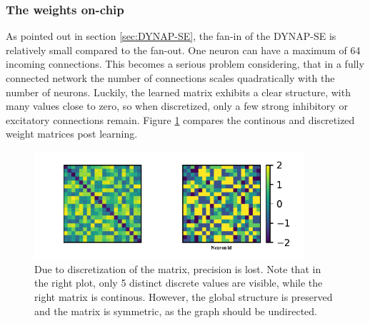 \documentclass[twoside,11pt]{article}
\begin{document}
\newpage

\subsubsection{The weights on-chip} \label{sec:weights}

As pointed out in section \ref{sec:DYNAP-SE}, the fan-in of the DYNAP-SE is relatively small
compared to the fan-out. One neuron can have a maximum of 64 incoming connections.
This becomes a serious problem considering, that in a fully connected network
the number of connections scales quadratically with the number of neurons.
Luckily, the learned matrix exhibits a clear structure, with many values close to zero, so when
discretized, only a few strong inhibitory or excitatory connections remain. Figure \ref{fig:spiking_vs_continous}
compares the continous and discretized weight matrices post learning.

\begin{figure}[!htb]
  \centering
  \includegraphics[width =10cm, height=4cm]{figures/weights.pdf}
  \caption{Due to discretization of the matrix, precision is lost. Note that in the right
  plot, only 5 distinct discrete values are visible, while the right matrix is continous.
  However, the global structure is preserved and the matrix is symmetric, as the graph
  should be undirected.}
  \label{fig:spiking_vs_continous}
\end{figure}
\end{document}
